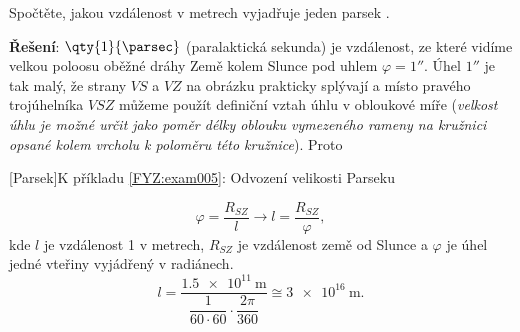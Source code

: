 \begin{mdframed}[style=mdexam]
  \begin{example}\label{FYZ:exam005}
    Spočtěte, jakou vzdálenost v metrech vyjadřuje jeden parsek \cite[s.~3]{Kulhanek2009}.
    
    \textbf{Řešení}: \(\qty{1}{\parsec}\) (paralaktická sekunda) je vzdálenost, ze které vidíme 
    velkou poloosu oběžné dráhy Země kolem Slunce pod uhlem \(\varphi = \ang{;;1}\). Úhel 
    \(\ang{;;1}\) je tak malý, že strany \(VS\) a \(VZ\) na obrázku prakticky splývají a místo 
    pravého trojúhelníka $VSZ$ můžeme použít definiční vztah úhlu v obloukové míře (\emph{velkost 
    úhlu je možné určit jako poměr délky oblouku vymezeného rameny na kružnici opsané kolem 
    vrcholu k poloměru této kružnice}). Proto 
    
    {\centering
      \captionsetup{type=figure}
      [Parsek]{K příkladu \ref{FYZ:exam005}: Odvození velikosti Parseku}
      \label{fyz:fig0224}
      \par}
    \begin{equation*}
      \varphi = \frac{R_{SZ}}{l} \rightarrow l = \frac{R_{SZ}}{\varphi},
    \end{equation*}
    kde $l$ je vzdálenost \qty{1}{\parsec} v metrech, $R_{SZ}$ je vzdálenost země od Slunce a 
    $\varphi$ je úhel jedné vteřiny vyjádřený v radiánech. 
    \begin{equation*}
        l = \frac{\qty{1.5e11}{\meter}}{\dfrac{1}{60\cdot60} 
            \cdot\dfrac{2\pi}{360}}\cong \qty{3e16}{\meter}.
    \end{equation*}
  \end{example}
\end{mdframed}